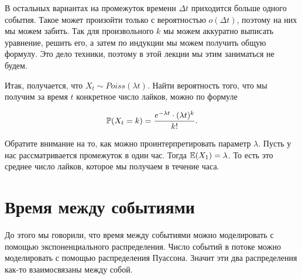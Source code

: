 \documentclass[12pt, a4paper, oneside]{article}
\begin{document}
В остальных вариантах на промежуток времени $\Delta t$ приходится больше одного события. Такое может произойти только с вероятностью  $o(\Delta t)$, поэтому на них мы можем забить. Так для произвольного $k$ мы можем аккуратно выписать уравнение, решить его, а затем по индукции мы можем получить общую формулу. Это дело техники, поэтому в этой лекции мы этим заниматься не будем.

Итак, получается, что $X_t \sim Poiss(\lambda t)$. Найти вероятность того, что мы получим за время $t$ конкретное число лайков, можно по формуле 

$$
\mathbb{P}(X_t = k) = \frac{e^{-\lambda t} \cdot (\lambda t)^k}{k!}.
$$

Обратите внимание на то, как можно проинтерпретировать параметр $\lambda$. Пусть у нас рассматривается промежуток в один час. Тогда $\mathbb{E}(X_1) = \lambda$. То есть это среднее число лайков, которое мы получаем в течение часа.

\section{Время между событиями}

До этого мы говорили, что время между событиями можно моделировать с помощью экспоненциального распределения.  Число событий в потоке можно моделировать с помощью распределения Пуассона. Значит эти два распределения как-то взаимосвязаны между собой.

\begin{center} 
\end{center} 
\end{document}
